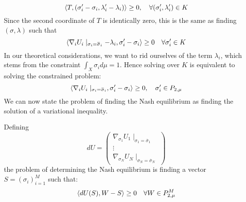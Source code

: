 \begin{equation}
  \left \langle T,(\sigma_i' -\sigma_i,\lambda_i'-\lambda_i) \right \rangle \geq 0, \quad \forall (\sigma_i', \lambda_i') \in K
\end{equation}
Since the second coordinate of $T$ is identically zero, this is the same as finding $(\sigma,\lambda)$ such that
\begin{equation}
  \label{eq:simp_var_eq}
  \ip{\nabla_i U_i \mid_{\sigma_i = \overbar{\sigma}_i} - \lambda_i}{\sigma_i' -\sigma_i} \geq 0 \quad \forall \sigma_i' \in K
\end{equation}
In our theoretical considerations, we want to rid ourselves of the term $\lambda_i$, which stems from the constraint $\int_X \sigma_i d\mu = 1$. Hence solving  over $K$ is equivalent to solving the constrained problem:
\begin{equation}
  \ip{\nabla_i U_i \mid_{\sigma_i = \overbar{\sigma}_i}}{\sigma_i' -\sigma_i} \geq 0, \quad \sigma_i' \in P_{2,\mu}
\end{equation}
We can now state the problem of finding the Nash equilibrium  as finding the solution of a variational inequality.
\begin{definition}
  \label{def:var_eq_nash}
  Defining
\begin{equation}
  dU = \begin{pmatrix} \nabla_{\sigma_1} U_1 \mid_{\sigma_1 = \overbar{\sigma}_1}\\
      \vdots \\
      \nabla_{\sigma_N} U_N \mid_{\sigma_N = \overbar{\sigma}_N} \end{pmatrix}
\end{equation}
the problem of determining the Nash equilibrium  is finding a vector $S = (\sigma_i)_{i=1}^M$ such that:
\begin{equation}
  \left \langle dU(S),W-S \right \rangle \geq 0 \quad \forall W\in P_{2,\mu}^M
\end{equation}
\end{definition}

